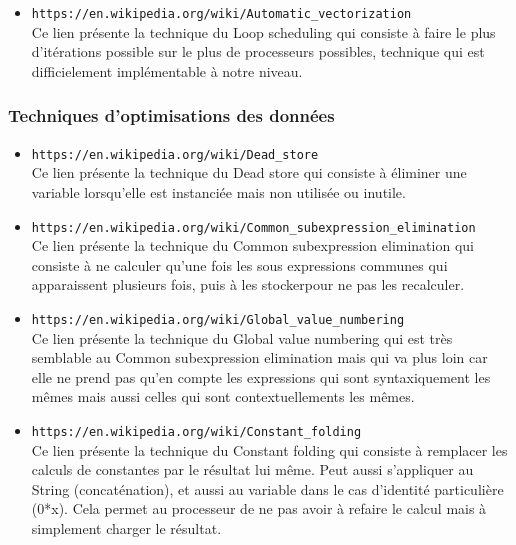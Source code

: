 \documentclass[a4paper]{article}
\begin{document}
\begin{itemize}
\item \texttt{https://en.wikipedia.org/wiki/Automatic\_vectorization} \\
Ce lien présente la technique du Loop scheduling qui consiste à faire le plus d'itérations possible sur le plus de processeurs possibles, technique qui est difficielement implémentable à notre niveau.\\
     \end{itemize}

\subsubsection{Techniques d'optimisations des données}
\begin{itemize}
\item \texttt{https://en.wikipedia.org/wiki/Dead\_store} \\
Ce lien présente la technique du Dead store qui consiste à éliminer une variable lorsqu'elle est instanciée mais non utilisée ou inutile.\\

\item \texttt{https://en.wikipedia.org/wiki/Common\_subexpression\_elimination} \\
Ce lien présente la technique du Common subexpression elimination qui consiste à ne calculer qu'une fois les sous expressions communes qui apparaissent plusieurs fois, puis à les stockerpour ne pas les recalculer.\\

\item \texttt{https://en.wikipedia.org/wiki/Global\_value\_numbering} \\
Ce lien présente la technique du Global value numbering qui est très semblable au Common subexpression elimination mais qui va plus loin car elle ne prend pas qu'en compte les expressions qui sont syntaxiquement les mêmes mais aussi celles qui sont contextuellements les mêmes.\\

\item \texttt{https://en.wikipedia.org/wiki/Constant\_folding} \\
Ce lien présente la technique du Constant folding qui consiste à remplacer les calculs de constantes par le résultat lui même. Peut aussi s'appliquer au String (concaténation), et aussi au variable dans le cas d'identité particulière (0*x). Cela permet au processeur de ne pas avoir à refaire le calcul mais à simplement charger le résultat.


\end{itemize}
\end{document}
